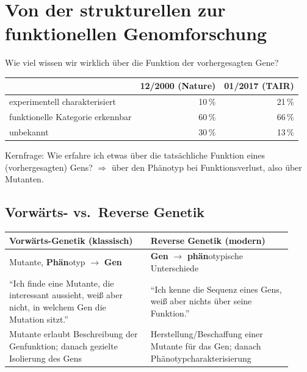 \section{Von der strukturellen zur funktionellen Genomforschung}\label{sec:von-der-strukturellen-zur-funktionellen-genomforschung}

Wie viel wissen wir wirklich über die Funktion der vorhergesagten Gene?
\begin{mytable}
    \begin{tabular}{@{}|l|r|r|@{}}
        \hline
        & \textbf{12/2000 (Nature)} & \textbf{01/2017 (TAIR)} \\
        \hline
        experimentell charakterisiert & 10\,\% & 21\,\% \\
        funktionelle Kategorie erkennbar & 60\,\% & 66\,\% \\
        unbekannt & 30\,\% & 13\,\% \\
        \hline
    \end{tabular}
\end{mytable}

\begin{bem}
    Kernfrage: Wie erfahre ich etwas über die tatsächliche Funktion eines (vorhergesagten) Gens? $\Rightarrow$ über den
    Phänotyp bei Funktionsverlust, also über Mutanten.
\end{bem}


\subsection*{Vorwärts- vs.\ Reverse Genetik}\label{subsec:vorwarts--vs.-reverse-genetik}
\begin{mytable}
    \begin{tabular}{@{}|p{0.46\linewidth}|p{0.46\linewidth}|@{}}
        \hline
        \textbf{Vorwärts-Genetik (klassisch)} & \textbf{Reverse Genetik (modern)} \\
        \hline
        Mutante, \textbf{Phän}otyp $\longrightarrow$ \textbf{Gen} & \textbf{Gen} $\longrightarrow$ \textbf{phän}otypische Unterschiede \\
        ``Ich finde eine Mutante, die interessant aussieht, wei{\ss} aber nicht, in welchem Gen die Mutation sitzt.'' & ``Ich kenne die Sequenz eines Gens, wei{\ss} aber nichts über seine Funktion.'' \\
        Mutante erlaubt Beschreibung der Genfunktion; danach gezielte Isolierung des Gens & Herstellung/Beschaffung einer Mutante für das Gen; danach Phänotypcharakterisierung \\
        \hline
    \end{tabular}
\end{mytable}

